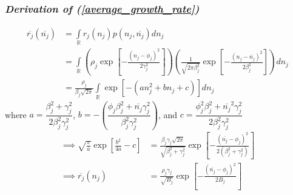 \documentclass{amsart}
\theoremstyle{definition}
\theoremstyle{remark}
\numberwithin{equation}{section}
\begin{document}
\subsubsection*{\textbf{\textit{Derivation of (\ref{average_growth_rate})}}}
\begin{align*}
	\overline{r_j}(\overline{n_j}) &= \int\limits_{\mathbb{R}}^{}r_j(n_j)p(n_j, \overline{n_j})dn_j \\
	&= \int\limits_{\mathbb{R}}\left(\rho_j\exp\left[-\frac{(n_j - \phi_j)^2}{2\gamma_j^2}\right]\right)\left(\frac{1}{\sqrt{2\pi\beta_j^2}}\exp\left[-\frac{(n_j - \overline{n_j})^2}{2\beta_j^2}\right]\right)dn_j \\
	&= \frac{\rho_j}{\beta_j\sqrt{2\pi}}\int\limits_{\mathbb{R}}\exp\left[-(an_j^2 + bn_j + c)\right]dn_j
\end{align*}
where $a = \dfrac{\beta_j^2 + \gamma_j^2}{2\beta_j^2\gamma_j^2}$, $b = -\left(\dfrac{\phi_j\beta_j^2 + \overline{n_j}\gamma_j^2}{\beta_j^2\gamma_j^2}\right)$, and $c = \dfrac{\phi_j^2\beta_j^2 + \overline{n_j}^2\gamma_j^2}{2\beta_j^2\gamma_j^2}$
\begin{align*}
	\implies \sqrt{\frac{\pi}{a}}\exp\left[\frac{b^2}{4a} - c\right] &= \frac{\beta_j\gamma_j\sqrt{2\pi}}{\sqrt{\beta_j^2 + \gamma_j^2}}\exp\left[-\frac{(\overline{n_j} - \phi_j)^2}{2(\beta_j^2 + \gamma_j^2)}\right] \\
	\implies \overline{r_j}(n_j) &= \frac{\rho_j\gamma_j}{\sqrt{B_j}}\exp\left[-\frac{(\overline{n_j} - \phi_j)^2}{2B_j}\right]
\end{align*}
\end{document}
